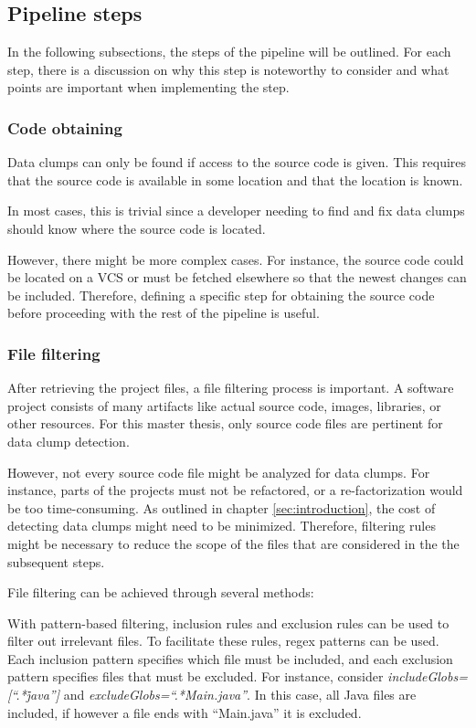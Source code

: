 \subsection{Pipeline steps}\label{sec:pipeline_steps}
In the following subsections, the steps of the pipeline will be outlined. For each step, there is a discussion on why this step is noteworthy to consider and what points are important when implementing the step.
\subsubsection{Code obtaining}\label{sec:code_obtaining}
Data clumps can only be found if access to the source code is given. This requires that the source code is available in some location and that the location is known.

In most cases, this is trivial since a developer needing to find and fix data clumps should know where the source code is located.

However, there might be more complex cases. For instance, the source code could be located on a \ac{VCS} or must be fetched elsewhere so that the newest changes can be included. Therefore, defining a specific step for obtaining the source code before proceeding with the rest of the pipeline is useful. 


\subsubsection{File filtering}\label{subsub:filtering_files}
After retrieving the project files, a file filtering process is important. A software project consists of many artifacts like actual source code, images, libraries, or other resources. For this master thesis, only source code files are pertinent for data clump detection. 


However, not every source code file might be analyzed for data clumps. For instance, parts of the projects must not be refactored, or a re-factorization would be too time-consuming. As outlined in chapter \ref{sec:introduction}, the cost of detecting data clumps might need to be minimized. Therefore, filtering rules might be necessary to reduce the scope of the files that are considered in the the subsequent steps.  

File filtering can be achieved through several methods:

With pattern-based filtering, inclusion rules and exclusion rules can be used to filter out irrelevant files.  To facilitate these rules, regex patterns can be used.  Each inclusion pattern specifies which file must be included, and each exclusion pattern specifies files that must be excluded. For instance, consider \textit{includeGlobs=[\enquote{.*\.java}]} and \textit{excludeGlobs=\enquote{.*Main.java}}. In this case, all Java files are included, if however a file ends with \enquote{Main.java} it is excluded.

